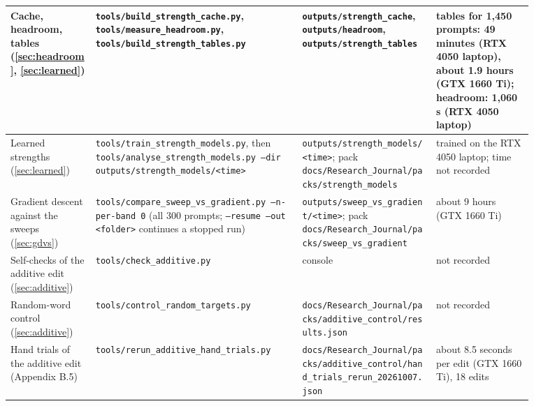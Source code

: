 \documentclass[12pt,a4paper]{report}
\begin{document}
{\begin{longtable}{|>{\raggedright\arraybackslash}p{0.148\linewidth}|>{\raggedright\arraybackslash}p{0.340\linewidth}|>{\raggedright\arraybackslash}p{0.222\linewidth}|>{\raggedright\arraybackslash}p{0.163\linewidth}|}
Cache, headroom, tables (\ref{sec:headroom}, \ref{sec:learned}) & \texttt{tools/\allowbreak{}build\_\allowbreak{}strength\_\allowbreak{}cache.\allowbreak{}py}, \texttt{tools/\allowbreak{}measure\_\allowbreak{}headroom.\allowbreak{}py}, \texttt{tools/\allowbreak{}build\_\allowbreak{}strength\_\allowbreak{}tables.\allowbreak{}py} & \texttt{outputs/\allowbreak{}strength\_\allowbreak{}cache}, \texttt{outputs/\allowbreak{}headroom}, \texttt{outputs/\allowbreak{}strength\_\allowbreak{}tables} & tables for 1,450 prompts: 49 minutes (RTX 4050 laptop), about 1.9 hours (GTX 1660 Ti); headroom: 1,060 s (RTX 4050 laptop) \\ \hline
Learned strengths (\ref{sec:learned}) & \texttt{tools/\allowbreak{}train\_\allowbreak{}strength\_\allowbreak{}models.\allowbreak{}py}, then \texttt{tools/\allowbreak{}analyse\_\allowbreak{}strength\_\allowbreak{}models.\allowbreak{}py --dir outputs/\allowbreak{}strength\_\allowbreak{}models/\allowbreak{}<time>} & \texttt{outputs/\allowbreak{}strength\_\allowbreak{}models/\allowbreak{}<time>}; pack \texttt{docs/\allowbreak{}Research\_\allowbreak{}Journal/\allowbreak{}packs/\allowbreak{}strength\_\allowbreak{}models} & trained on the RTX 4050 laptop; time not recorded \\ \hline
Gradient descent against the sweeps (\ref{sec:gdvs}) & \texttt{tools/\allowbreak{}compare\_\allowbreak{}sweep\_\allowbreak{}vs\_\allowbreak{}gradient.\allowbreak{}py --n-per-band 0} (all 300 prompts; \texttt{--resume --out <folder>} continues a stopped run) & \texttt{outputs/\allowbreak{}sweep\_\allowbreak{}vs\_\allowbreak{}gradient/\allowbreak{}<time>}; pack \texttt{docs/\allowbreak{}Research\_\allowbreak{}Journal/\allowbreak{}packs/\allowbreak{}sweep\_\allowbreak{}vs\_\allowbreak{}gradient} & about 9 hours (GTX 1660 Ti) \\ \hline
Self-checks of the additive edit (\ref{sec:additive}) & \texttt{tools/\allowbreak{}check\_\allowbreak{}additive.\allowbreak{}py} & console & not recorded \\ \hline
Random-word control (\ref{sec:additive}) & \texttt{tools/\allowbreak{}control\_\allowbreak{}random\_\allowbreak{}targets.\allowbreak{}py} & \texttt{docs/\allowbreak{}Research\_\allowbreak{}Journal/\allowbreak{}packs/\allowbreak{}additive\_\allowbreak{}control/\allowbreak{}results.\allowbreak{}json} & not recorded \\ \hline
Hand trials of the additive edit (Appendix B.5) & \texttt{tools/\allowbreak{}rerun\_\allowbreak{}additive\_\allowbreak{}hand\_\allowbreak{}trials.\allowbreak{}py} & \texttt{docs/\allowbreak{}Research\_\allowbreak{}Journal/\allowbreak{}packs/\allowbreak{}additive\_\allowbreak{}control/\allowbreak{}hand\_\allowbreak{}trials\_\allowbreak{}rerun\_\allowbreak{}20261007.\allowbreak{}json} & about 8.5 seconds per edit (GTX 1660 Ti), 18 edits \\ \hline

\end{longtable}}
\end{document}
